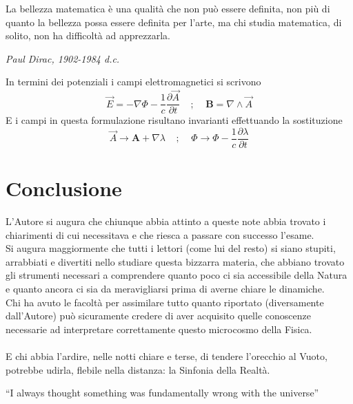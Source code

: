\documentclass[twoside]{article}
\renewcommand{\vec}[1]{\textbf{#1}}
\begin{document}
\vspace{9mm}
\epigraph{La bellezza matematica è una qualità che non può essere definita, non più di quanto la bellezza possa essere definita per l'arte, ma chi studia matematica, di solito, non ha difficoltà ad apprezzarla.}{\textit{Paul Dirac, 1902-1984 d.c.}}
\vspace{9mm}

In termini dei potenziali i campi elettromagnetici si scrivono
\begin{equation}
    \Vec{E}=-\nabla \Phi - \frac{1}{c}\frac{\partial \Vec{A}}{\partial t} \ \ \ \ \ ; \ \ \ \ \ \vec{B}=\nabla \wedge \Vec{A}
\end{equation}
E i campi in questa formulazione risultano invarianti effettuando la sostituzione
\begin{equation}
    \Vec{A}\to \vec{A}+\nabla \lambda \ \ \ \ \ ; \ \ \ \ \ \Phi \to \Phi - \frac{1}{c}\frac{\partial\lambda}{\partial t}
\end{equation}



\newpage

\section{Conclusione}
L'Autore si augura che chiunque abbia attinto a queste note abbia trovato i chiarimenti di cui necessitava e che riesca a passare con successo l'esame.
\\
Si augura maggiormente che tutti i lettori (come lui del resto) si siano stupiti, arrabbiati e divertiti nello studiare questa bizzarra materia, che abbiano trovato gli strumenti necessari a comprendere quanto poco ci sia accessibile della Natura e quanto ancora ci sia da meravigliarsi prima di averne chiare le dinamiche.
\\
Chi ha avuto le facoltà per assimilare tutto quanto riportato (diversamente dall'Autore) può sicuramente credere di aver acquisito quelle conoscenze necessarie ad interpretare correttamente questo microcosmo della Fisica.
\\ \\

E chi abbia l'ardire, nelle notti chiare e terse,  di tendere l'orecchio al Vuoto, potrebbe udirla, flebile nella distanza: la Sinfonia della Realtà.

\vspace{3 cm}
``I always thought something was fundamentally wrong with the universe'' \citep{adams1995hitchhiker}

\vfill



\end{document}
